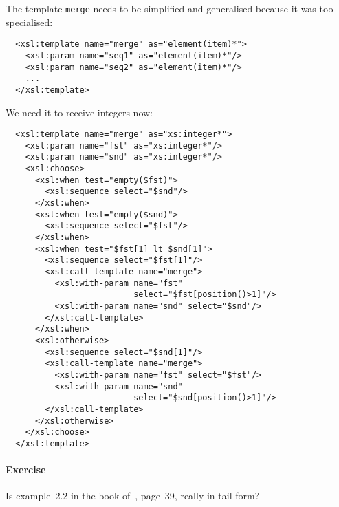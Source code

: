 The template \texttt{merge} needs to be simplified and generalised
because it was too specialised:
\begin{verbatim}
  <xsl:template name="merge" as="element(item)*">
    <xsl:param name="seq1" as="element(item)*"/>
    <xsl:param name="seq2" as="element(item)*"/>
    ...
  </xsl:template>
\end{verbatim}
We need it to receive integers now:
\begin{verbatim}
  <xsl:template name="merge" as="xs:integer*">
    <xsl:param name="fst" as="xs:integer*"/>
    <xsl:param name="snd" as="xs:integer*"/>
    <xsl:choose>
      <xsl:when test="empty($fst)">
        <xsl:sequence select="$snd"/>
      </xsl:when>
      <xsl:when test="empty($snd)">
        <xsl:sequence select="$fst"/>
      </xsl:when>
      <xsl:when test="$fst[1] lt $snd[1]">
        <xsl:sequence select="$fst[1]"/>
        <xsl:call-template name="merge">
          <xsl:with-param name="fst"
                          select="$fst[position()>1]"/>
          <xsl:with-param name="snd" select="$snd"/>
        </xsl:call-template>
      </xsl:when>
      <xsl:otherwise>
        <xsl:sequence select="$snd[1]"/>
        <xsl:call-template name="merge">
          <xsl:with-param name="fst" select="$fst"/>
          <xsl:with-param name="snd"
                          select="$snd[position()>1]"/>
        </xsl:call-template>
      </xsl:otherwise>
    </xsl:choose>
  </xsl:template>
\end{verbatim}

\paragraph{Exercise}

Is example~2.2 in the book of~\cite{Mangano_2006}, page~39, really in
tail form?
